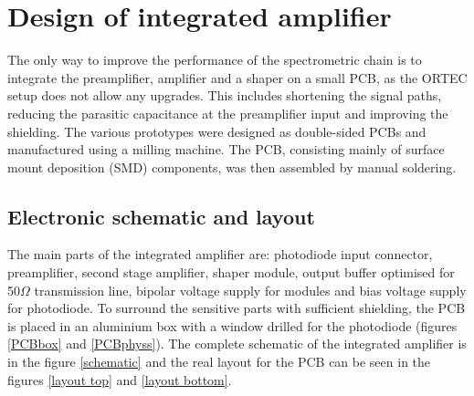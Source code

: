 \chapter{Design of integrated amplifier}
The only way to improve the performance of the spectrometric chain is to integrate the preamplifier, amplifier and a shaper on a small PCB, as the ORTEC setup does not allow any upgrades. This includes shortening the signal paths, reducing the parasitic capacitance at the preamplifier input and improving the shielding. The various prototypes were designed as double-sided PCBs and manufactured using a milling machine. The PCB, consisting mainly of surface mount deposition (SMD) components, was then assembled by manual soldering.

\section{Electronic schematic and layout}
The main parts of the integrated amplifier are: photodiode input connector, preamplifier, second stage amplifier, shaper module, output buffer optimised for 50\nobreakspace$\Omega$ transmission line, bipolar voltage supply for modules and bias voltage supply for photodiode. To surround the sensitive parts with sufficient shielding, the PCB is placed in an aluminium box with a window drilled for the photodiode (figures \ref{PCBbox} and \ref{PCBphyss}). The complete schematic of the integrated amplifier is in the figure \ref{schematic} and the real layout for the PCB can be seen in the figures \ref{layout top} and \ref{layout bottom}.



